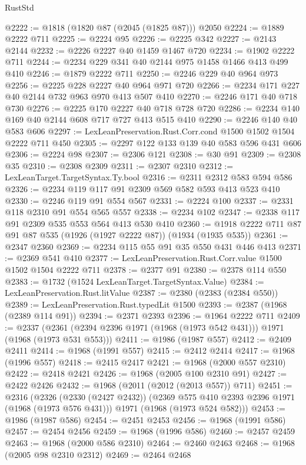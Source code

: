 \begin{lexlean}{RustStd}
\begin{coremodule}
{\begin{coremodule}
{{{{{@2222 := @1818 (@1820 @87 (@2045 (@1825 @87))) @2050
@2224 := @1889 @2222 @711
@2225 := @2224 @95
@2226 := @2225 @342
@2227 := @2143 @2144
@2232 := @2226 @2227 @40 @1459 @1467 @720
@2234 := @1902 @2222 @711
@2244 := @2234 @229 @341 @40 @2144 @975 @1458 @1466 @413 @499 @410
@2246 := @1879 @2222 @711
@2250 := @2246 @229 @40 @964 @973
@2256 := @2225 @228 @2227 @40 @964 @971 @720
@2266 := @2234 @171 @227 @40 @2144 @732 @963 @970 @413 @507 @410
@2270 := @2246 @171 @40 @718 @730
@2276 := @2225 @170 @2227 @40 @718 @728 @720
@2286 := @2234 @140 @169 @40 @2144 @608 @717 @727 @413 @515 @410
@2290 := @2246 @140 @40 @583 @606
@2297 := LexLeanPreservation.Rust.Corr.cond @1500 @1502 @1504 @2222 @711 @450
@2305 := @2297 @122 @133 @139 @40 @583 @596 @431 @606
@2306 := @2224 @98
@2307 := @2306 @121
@2308 := @30 @91
@2309 := @2308 @35
@2310 := @2308 @2309
@2311 := @2307 @2310
@2312 := LexLeanTarget.TargetSyntax.Ty.bool
@2316 := @2311 @2312 @583 @594 @586
@2326 := @2234 @119 @117 @91 @2309 @569 @582 @593 @413 @523 @410
@2330 := @2246 @119 @91 @554 @567
@2331 := @2224 @100
@2337 := @2331 @118 @2310 @91 @554 @565 @557
@2338 := @2234 @102
@2347 := @2338 @117 @91 @2309 @535 @553 @564 @413 @530 @410
@2360 := @1918 @2222 @711 @87 @91 @87 @535 (@1926 (@1927 @2222 @87)) (@1934 (@1935 @535))
@2361 := @2347 @2360
@2369 := @2234 @115 @55 @91 @35 @550 @431 @446 @413
@2371 := @2369 @541 @410
@2377 := LexLeanPreservation.Rust.Corr.value @1500 @1502 @1504 @2222 @711
@2378 := @2377 @91
@2380 := @2378 @114 @550
@2383 := @1732 (@1524 LexLeanTarget.TargetSyntax.Value)
@2384 := LexLeanPreservation.Rust.litValue
@2387 := @2380 (@2383 (@2384 @550))
@2389 := LexLeanPreservation.Rust.typedLit @1500
@2393 := @2387 (@1968 (@2389 @114 @91))
@2394 := @2371 @2393
@2396 := @1964 @2222 @711
@2409 := @2337 (@2361 (@2394 @2396 @1971 (@1968 (@1973 @542 @431))) @1971 (@1968 (@1973 @531 @553)))
@2411 := @1986 (@1987 @557)
@2412 := @2409 @2411
@2414 := @1968 (@1991 @557)
@2415 := @2412 @2414
@2417 := @1968 (@1996 @557)
@2418 := @2415 @2417
@2421 := @1968 (@2000 @557 @2310)
@2422 := @2418 @2421
@2426 := @1968 (@2005 @100 @2310 @91)
@2427 := @2422 @2426
@2432 := @1968 (@2011 (@2012 (@2013 @557)) @711)
@2451 := @2316
    (@2326
      (@2330 (@2427 @2432))
      (@2369 @575 @410 @2393 @2396 @1971 (@1968 (@1973 @576 @431)))
      @1971
      (@1968 (@1973 @524 @582)))
@2453 := @1986 (@1987 @586)
@2454 := @2451 @2453
@2456 := @1968 (@1991 @586)
@2457 := @2454 @2456
@2459 := @1968 (@1996 @586)
@2460 := @2457 @2459
@2463 := @1968 (@2000 @586 @2310)
@2464 := @2460 @2463
@2468 := @1968 (@2005 @98 @2310 @2312)
@2469 := @2464 @2468
}}}}}
\end{coremodule}}
\end{coremodule}
\end{lexlean}
